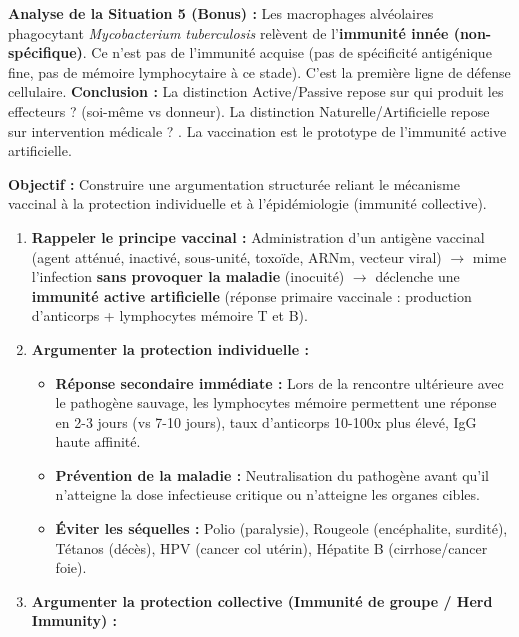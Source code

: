 \documentclass[11pt]{article}
\newcommand{\cle}[1]{{\popxbold\color{popdark}#1}}
\begin{document}
\begin{exoresolu}
\begin{center}
\begin{tabular}{|c|c|c|c|}
    \end{tabular}
    \end{center}
    \textbf{Analyse de la Situation 5 (Bonus) :} Les macrophages alvéolaires phagocytant \emph{Mycobacterium tuberculosis} relèvent de l'\textbf{immunité innée (non-spécifique)}. Ce n'est pas de l'immunité acquise (pas de spécificité antigénique fine, pas de mémoire lymphocytaire à ce stade). C'est la première ligne de défense cellulaire.
    \textbf{Conclusion :} La distinction Active/Passive repose sur \og qui produit les effecteurs ? \fg (soi-même vs donneur). La distinction Naturelle/Artificielle repose sur \og intervention médicale ? \fg. La vaccination est le prototype de l'immunité active artificielle.
\end{exoresolu}

\begin{methode}
    \textbf{Objectif :} Construire une argumentation structurée reliant le mécanisme vaccinal à la protection individuelle et à l'épidémiologie (immunité collective).
    \begin{enumerate}
        \item \textbf{Rappeler le principe vaccinal :} Administration d'un \cle{antigène vaccinal} (agent atténué, inactivé, sous-unité, toxoïde, ARNm, vecteur viral) $\rightarrow$ mime l'infection \textbf{sans provoquer la maladie} (inocuité) $\rightarrow$ déclenche une \textbf{immunité active artificielle} (réponse primaire vaccinale : production d'anticorps + lymphocytes mémoire T et B).
        \item \textbf{Argumenter la protection individuelle :}
        \begin{itemize}
            \item \textbf{Réponse secondaire immédiate :} Lors de la rencontre ultérieure avec le pathogène sauvage, les lymphocytes mémoire permettent une réponse en 2-3 jours (vs 7-10 jours), taux d'anticorps 10-100x plus élevé, IgG haute affinité.
            \item \textbf{Prévention de la maladie :} Neutralisation du pathogène avant qu'il n'atteigne la dose infectieuse critique ou n'atteigne les organes cibles.
            \item \textbf{Éviter les séquelles :} Polio (paralysie), Rougeole (encéphalite, surdité), Tétanos (décès), HPV (cancer col utérin), Hépatite B (cirrhose/cancer foie).
        \end{itemize}
        \item \textbf{Argumenter la protection collective (Immunité de groupe / Herd Immunity) :}

\end{enumerate}
\end{methode}
\end{document}
